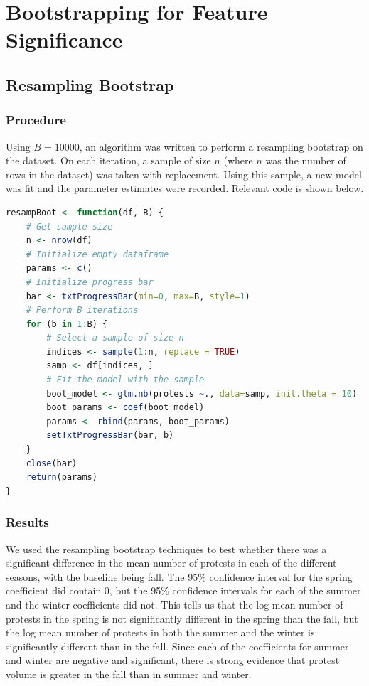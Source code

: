 \documentclass[12pt]{article}
\begin{document}
\newpage
\section{Bootstrapping for Feature Significance}
\subsection{Resampling Bootstrap}
\subsubsection*{Procedure}
Using $B = 10000$, an algorithm was written to perform a resampling bootstrap on the dataset. On each iteration, a sample of size $n$ (where $n$ was the number of rows in the dataset) was taken with replacement. Using this sample, a new model was fit and the parameter estimates were recorded. Relevant code is shown below.

\vspace{0.5cm}
\begin{lstlisting}[language=R]
resampBoot <- function(df, B) {
	# Get sample size
	n <- nrow(df)
	# Initialize empty dataframe
	params <- c()
	# Initialize progress bar
	bar <- txtProgressBar(min=0, max=B, style=1)
	# Perform B iterations
	for (b in 1:B) {
		# Select a sample of size n
		indices <- sample(1:n, replace = TRUE)
		samp <- df[indices, ]
		# Fit the model with the sample
		boot_model <- glm.nb(protests ~., data=samp, init.theta = 10)
		boot_params <- coef(boot_model)
		params <- rbind(params, boot_params)
		setTxtProgressBar(bar, b)
	}
	close(bar)
	return(params)
}
\end{lstlisting}

\subsubsection*{Results}
We used the resampling bootstrap techniques to test whether there was a significant difference in the mean number of protests in each of the different seasons, with the baseline being fall. The 95\% confidence interval for the spring coefficient did contain 0, but the 95\% confidence intervals for each of the summer and the winter coefficients did not. This tells us that the log mean number of protests in the spring is not significantly different in the spring than the fall, but the log mean number of protests in both the summer and the winter is significantly different than in the fall. Since each of the coefficients for summer and winter are negative and significant, there is strong evidence that protest volume is greater in the fall than in summer and winter.
\end{document}
